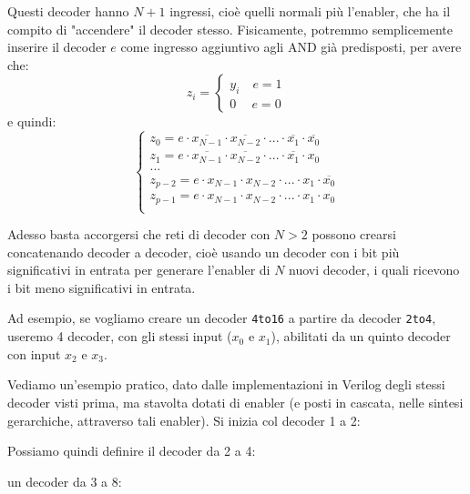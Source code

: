 \documentclass[a4paper,11pt]{article}
\begin{document}
Questi decoder hanno $N + 1$ ingressi, cioè quelli normali più l'enabler, che ha il compito di "accendere" il decoder stesso.
Fisicamente, potremmo semplicemente inserire il decoder $e$ come ingresso aggiuntivo agli AND già predisposti, per avere che:
\[
	z_i =
	\begin{cases}
			y_i \quad e = 1 \\
			0 \quad \ e = 0
	\end{cases}
\]
e quindi:
\[
	\begin{cases}
		z_0 = e \cdot \overline{x_{N-1}} \cdot \overline{x_{N-2}} \cdot ... \cdot \overline{x_1} \cdot \overline{x_0}	\\
		z_1 = e \cdot \overline{x_{N-1}} \cdot \overline{x_{N-2}} \cdot ... \cdot \overline{x_1} \cdot x_0	\\
		... \\ 
		z_{p-2} = e \cdot x_{N-1} \cdot x_{N-2} \cdot ... \cdot x_1 \cdot \overline{x_0}	\\
		z_{p-1} = e \cdot x_{N-1} \cdot x_{N-2} \cdot ... \cdot x_1 \cdot x_0	\\
	\end{cases}
\]

Adesso basta accorgersi che reti di decoder con $N > 2$ possono crearsi concatenando decoder a decoder, cioè usando un decoder con i bit più significativi in entrata per generare l'enabler di $N$ nuovi decoder, i quali ricevono i bit meno significativi in entrata. 

Ad esempio, se vogliamo creare un decoder \texttt{4to16} a partire da decoder \texttt{2to4}, useremo 4 decoder, con gli stessi input ($x_0$ e $x_1$), abilitati da un quinto decoder con input $x_2$ e $x_3$.

Vediamo un'esempio pratico, dato dalle implementazioni in Verilog degli stessi decoder visti prima, ma stavolta dotati di enabler (e posti in cascata, nelle sintesi gerarchiche, attraverso tali enabler).
Si inizia col decoder 1 a 2:



Possiamo quindi definire il decoder da 2 a 4:



un decoder da 3 a 8:


\end{document}
